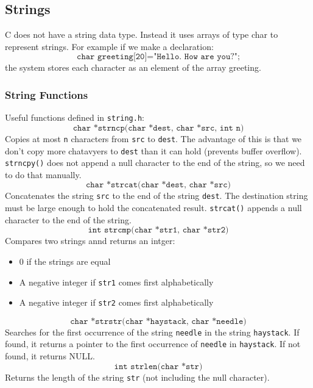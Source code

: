 \documentclass[a4paper, 10pt]{article}
\begin{document}
\subsection{Strings}
\begin{conceptbox}
    C does not have a string data type. Instead it uses arrays of type char to represent strings. For example if we make a declaration:
    $$\texttt{char greeting[20]="Hello. How are you?";}$$
    the system stores each character as an element of the array greeting.
\end{conceptbox}
\subsubsection{String Functions}
Useful functions defined in \texttt{string.h}: \\[2ex]
$$\texttt{char *strncp(char *dest, char *src, int n)} $$
Copies at most \texttt{n} characters from \texttt{src} to \texttt{dest}. The advantage of this is that we don't copy more chatavyers to \texttt{dest} than it can hold (prevents buffer overflow). \texttt{strncpy()} does not append a null character to the end of the string, so we need to do that manually. \\[2ex]
$$\texttt{char *strcat(char *dest, char *src)}$$
Concatenates the string \texttt{src} to the end of the string \texttt{dest}. The destination string must be large enough to hold the concatenated result. \texttt{strcat()} appends a null character to the end of the string. \\[2ex]
$$\texttt{int strcmp(char *str1, char *str2)}$$
Compares two strings annd returns an intger:
\begin{itemize}
    \item 0 if the strings are equal
    \item A negative integer if \texttt{str1} comes first alphabetically
    \item A negative integer if \texttt{str2} comes first alphabetically
\end{itemize}
$$\texttt{char *strstr(char *haystack, char *needle)} $$
Searches for the first occurrence of the string \texttt{needle} in the string \texttt{haystack}. If found, it returns a pointer to the first occurrence of \texttt{needle} in \texttt{haystack}. If not found, it returns NULL. \\[2ex]
$$\texttt{int strlen(char *str)}$$
Returns the length of the string \texttt{str} (not including the null character).

\pagebreak
\end{document}
